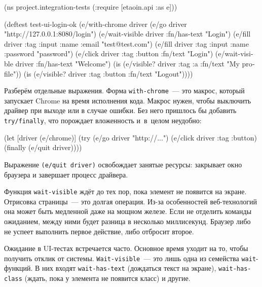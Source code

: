 \else

\begin{english}
  \begin{clojure}
(ns project.integration-tests
  (:require [etaoin.api :as e]))

(deftest test-ui-login-ok
  (e/with-chrome {} driver
    (e/go driver "http://127.0.0.1:8080/login")
    (e/wait-visible driver {:fn/has-text "Login"})
    (e/fill driver {:tag :input :name :email} "test@test.com")
    (e/fill driver {:tag :input :name :password} "password")
    (e/click driver {:tag :button :fn/text "Login"})
    (e/wait-visible driver {:fn/has-text "Welcome"})
    (is (e/visible? driver {:tag :a :fn/text "My profile"}))
    (is (e/visible? driver {:tag :button :fn/text "Logout"}))))
  \end{clojure}
\end{english}

\fi

Разберём отдельные выражения. Форма \verb|with-chrome|~--- это макрос, который
запускает Chrome на время исполнения кода. Макрос нужен, чтобы выключить драйвер
при выходе или в случае ошибки. Без него пришлось бы добавить
\verb|try/finally|, что порождает вложенность и~в~целом неудобно:


\begin{english}
  \begin{clojure}
(let [driver (e/chrome)]
  (try
    (e/go driver "http://...")
    (e/click driver {:tag :button})
    (finally
      (e/quit driver))))
  \end{clojure}
\end{english}

Выражение \verb|(e/quit driver)| освобождает занятые ресурсы: закрывает окно
браузера и завершает процесс драйвера.

Функция \verb|wait-visible| ждёт до тех пор, пока элемент не появится на
экране. Отрисовка страницы~--- это долгая операция. Из-за особенностей
веб-технологий она может быть медленной даже на мощном железе. Если не отделить
команды ожиданием, между ними будет разница в несколько миллисекунд. Браузер
либо не успеет выполнить первое действие, либо отбросит второе.

Ожидание в UI-тестах встречается часто. Основное время уходит на то, чтобы
получить отклик от системы. \verb|Wait-visible|~--- это лишь одна из семейства
\verb|wait|-функций. В них входят \verb|wait-has-text| (дождаться текст на
экране), \verb|wait-has-class| (ждать, пока у элемента не появится класс) и
другие.

